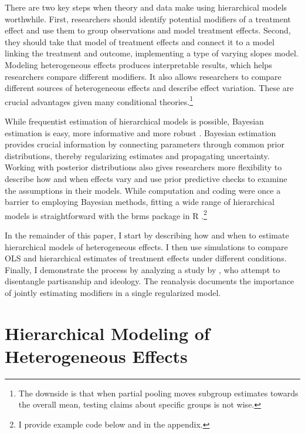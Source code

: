 \documentclass[12pt]{article}
\begin{document}
There are two key steps when theory and data make using hierarchical models worthwhile.
First, researchers should identify potential modifiers of a treatment effect and use them to group observations and model treatment effects.
Second, they should take that model of treatment effects and connect it to a model linking the treatment and outcome, implementing a type of varying slopes model. 
Modeling heterogeneous effects produces interpretable results, which helps researchers compare different modifiers. 
It also allows researchers to compare different sources of heterogeneous effects and describe effect variation.  
These are crucial advantages given many conditional theories.\footnote{The downside is that when partial pooling moves subgroup estimates towards the overall mean, testing claims about specific groups is not wise.}


While frequentist estimation of hierarchical models is possible, Bayesian estimation is easy, more informative and more robust \citep{Stegmueller2013}.
Bayesian estimation provides crucial information by connecting parameters through common prior distributions, thereby regularizing estimates and propagating uncertainty. 
Working with posterior distributions also gives researchers more flexibility to describe how and when effects vary and use prior predictive checks to examine the assumptions in their models. 
While computation and coding were once a barrier to employing Bayesian methods, fitting a wide range of hierarchical models is straightforward with the brms package in \textsf{R} \citep{Buerkner2017}.\footnote{I provide example code below and in the appendix.}



In the remainder of this paper, I start by describing how and when to estimate hierarchical models of heterogeneous effects.
I then use simulations to compare OLS and hierarchical estimates of treatment effects under different conditions.
Finally, I demonstrate the process by analyzing a study by \citet{BarberPope2019}, who attempt to disentangle partisanship and ideology.
The reanalysis documents the importance of jointly estimating modifiers in a single regularized model.



\section{Hierarchical Modeling of Heterogeneous Effects}
\end{document}
